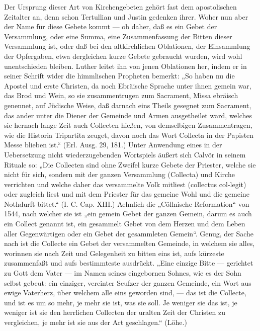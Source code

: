 Der Ursprung dieser Art von Kirchengebeten gehört fast dem apostolischen Zeitalter an, denn schon Tertullian und Justin gedenken ihrer. Woher nun aber der Name für diese Gebete kommt — ob daher, daß es ein Gebet der Versammlung, oder eine Summa, eine Zusammenfassung der Bitten dieser Versammlung ist, oder daß bei den altkirchlichen Oblationen, der Einsammlung der Opfergaben, etwa dergleichen kurze Gebete gebraucht wurden, wird wohl unentschieden bleiben. Luther leitet ihn von jenen Oblationen her, indem er in seiner Schrift wider die himmlischen Propheten bemerkt: „So haben nu die Apostel und erste Christen, da noch Ebräische Sprache unter ihnen gemein war, das Brod und Wein, so sie zusammentrugen zum Sacrament, Missa ebräisch genennet, auf Jüdische Weise, daß darnach eins Theils gesegnet zum Sacrament, das ander unter die Diener der Gemeinde und Armen ausgetheilet ward, welches sie hernach lange Zeit auch Collecten hießen, von demselbigen Zusammentragen, wie die Historia Tripartita zeuget, davon noch das Wort Collecta in der Papisten Messe blieben ist.“ (Erl. Ausg. 29, 181.) Unter Anwendung eines in der Uebersetzung nicht wiederzugebenden Wortspiels äußert sich Calvör in seinem Rituale so: „Die Collecten sind ohne Zweifel kurze Gebete der Priester, welche sie nicht für sich, sondern mit der ganzen Versammlung (Collecta) und Kirche verrichten und welche daher das versammelte Volk mitliest (collectus col-legit) oder zugleich liest und mit dem Priester für das gemeine Wohl und die gemeine Nothdurft bittet.“ (I. C. Cap. XIII.) Aehnlich die „Cöllnische Reformation“ von 1544, nach welcher sie ist „ein gemein Gebet der ganzen Gemein, darum es auch ein Collect genannt ist, ein gesammelt Gebet von dem Herzen und dem Leben aller Gegenwärtigen oder ein Gebet der gesammleten Gemein“. Genug, der Sache nach ist die Collecte ein Gebet der versammelten Gemeinde, in welchem sie alles, worinnen sie nach Zeit und Gelegenheit zu bitten eins ist, aufs kürzeste zusammenfaßt und aufs bestimmteste ausdrückt. „Eine einzige Bitte — gerichtet zu Gott dem Vater — im Namen seines eingebornen Sohnes, wie es der Sohn selbst gebeut: ein einziger, vereinter Seufzer der ganzen Gemeinde, ein Wort aus ewige Vaterherz, über welchem alle eins geworden sind, — das ist die Collecte, und ist es um so mehr, je mehr sie ist, was sie soll. Je weniger sie das ist, je weniger ist sie den herrlichen Collecten der uralten Zeit der Christen zu vergleichen, je mehr ist sie aus der Art geschlagen.“ (Löhe.)

